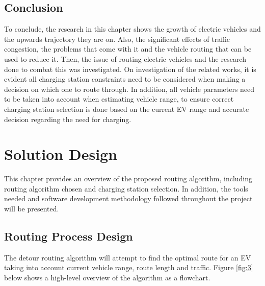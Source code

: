 \documentclass[11pt]{report}
\begin{document}
\section{Conclusion}

To conclude, the research in this chapter shows the growth of electric vehicles and the upwards trajectory they are on. Also, the significant effects of traffic congestion, the problems that come with it and the vehicle routing that can be used to reduce it. Then, the issue of routing electric vehicles and the research done to combat this was investigated. On investigation of the related works, it is evident all charging station constraints need to be considered when making a decision on which one to route through. In addition, all vehicle parameters need to be taken into account when estimating vehicle range, to ensure correct charging station selection is done based on the current EV range and accurate decision regarding the need for charging.

\newpage

\chapter{Solution Design}

\newpage

\noindent This chapter provides an overview of the proposed routing algorithm, including routing algorithm chosen and charging station selection. In addition, the tools needed and software development methodology followed throughout the project will be presented.

\section{Routing Process Design}

The detour routing algorithm will attempt to find the optimal route for an EV taking into account current vehicle range, route length and traffic. Figure \ref{fig:3} below shows a high-level overview of the algorithm as a flowchart.
\end{document}
